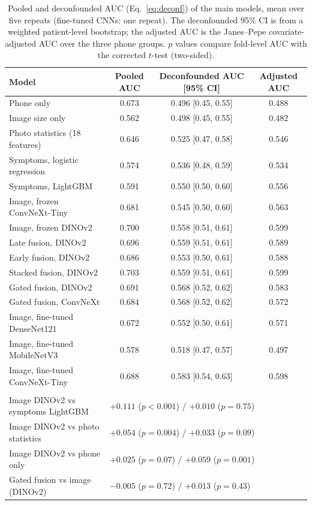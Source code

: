 \documentclass[preprint,12pt]{elsarticle}
\begin{document}
\begin{table}[!htbp]
\centering
\footnotesize
\caption{Pooled and deconfounded AUC (Eq.~\ref{eq:deconf}) of the main models, mean over five repeats (fine-tuned CNNs: one repeat). The deconfounded 95\% CI is from a weighted patient-level bootstrap; the adjusted AUC is the Janes--Pepe covariate-adjusted AUC over the three phone groups. $p$ values compare fold-level AUC with the corrected $t$-test (two-sided).}
\label{tab:deconf}
\setlength{\tabcolsep}{4pt}
\begin{tabular}{@{}>{\raggedright\arraybackslash}p{4.6cm}ccc@{}}
\toprule
Model & Pooled AUC & Deconfounded AUC [95\% CI] & Adjusted AUC \\
\midrule
Phone only & 0.673 & 0.496 [0.45, 0.55] & 0.488 \\
Image size only & 0.562 & 0.498 [0.45, 0.55] & 0.482 \\
Photo statistics (18 features) & 0.646 & 0.525 [0.47, 0.58] & 0.546 \\
Symptoms, logistic regression & 0.574 & 0.536 [0.48, 0.59] & 0.534 \\
Symptoms, LightGBM & 0.591 & 0.550 [0.50, 0.60] & 0.556 \\
Image, frozen ConvNeXt-Tiny & 0.681 & 0.545 [0.50, 0.60] & 0.563 \\
Image, frozen DINOv2 & 0.700 & 0.558 [0.51, 0.61] & 0.599 \\
Late fusion, DINOv2 & 0.696 & 0.559 [0.51, 0.61] & 0.589 \\
Early fusion, DINOv2 & 0.686 & 0.553 [0.50, 0.61] & 0.588 \\
Stacked fusion, DINOv2 & 0.703 & 0.559 [0.51, 0.61] & 0.599 \\
Gated fusion, DINOv2 & 0.691 & 0.568 [0.52, 0.62] & 0.583 \\
Gated fusion, ConvNeXt & 0.684 & 0.568 [0.52, 0.62] & 0.572 \\
Image, fine-tuned DenseNet121 & 0.672 & 0.552 [0.50, 0.61] & 0.571 \\
Image, fine-tuned MobileNetV3 & 0.578 & 0.518 [0.47, 0.57] & 0.497 \\
Image, fine-tuned ConvNeXt-Tiny & 0.688 & 0.583 [0.54, 0.63] & 0.598 \\
\addlinespace
\multicolumn{4}{@{}l}{\textit{Paired comparisons: $\Delta$ pooled AUC ($p$) / $\Delta$ deconfounded AUC ($p$)}} \\
Image DINOv2 vs symptoms LightGBM & \multicolumn{3}{l}{$+0.111$ ($p < 0.001$) / $+0.010$ ($p = 0.75$)} \\
Image DINOv2 vs photo statistics & \multicolumn{3}{l}{$+0.054$ ($p = 0.004$) / $+0.033$ ($p = 0.09$)} \\
Image DINOv2 vs phone only & \multicolumn{3}{l}{$+0.025$ ($p = 0.07$) / $+0.059$ ($p = 0.001$)} \\
Gated fusion vs image (DINOv2) & \multicolumn{3}{l}{$-0.005$ ($p = 0.72$) / $+0.013$ ($p = 0.43$)} \\
\bottomrule
\end{tabular}
\end{table}
\end{document}
